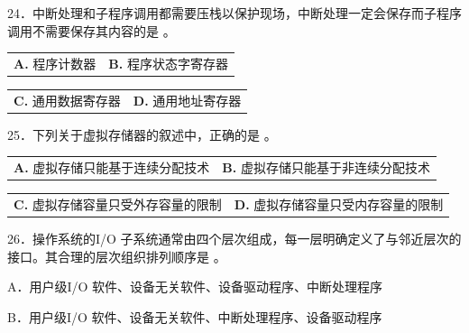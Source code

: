 \documentclass[UTF8,11pt]{ctexart}
\begin{document}
24．中断处理和子程序调用都需要压栈以保护现场，中断处理一定会保存而子程序调用不需要保存其内容的是 。


\begin{center}\begin{tabular}{>{\raggedright\arraybackslash}p{\dimexpr(\linewidth-4\tabcolsep)/2\relax}>{\raggedright\arraybackslash}p{\dimexpr(\linewidth-4\tabcolsep)/2\relax}}
\textbf{A.} 程序计数器 & \textbf{B.} 程序状态字寄存器\\[.35em]\end{tabular}\end{center}

\begin{center}\begin{tabular}{>{\raggedright\arraybackslash}p{\dimexpr(\linewidth-4\tabcolsep)/2\relax}>{\raggedright\arraybackslash}p{\dimexpr(\linewidth-4\tabcolsep)/2\relax}}
\textbf{C.} 通用数据寄存器 & \textbf{D.} 通用地址寄存器\\[.35em]\end{tabular}\end{center}

25．下列关于虚拟存储器的叙述中，正确的是 。


\begin{center}\begin{tabular}{>{\raggedright\arraybackslash}p{\dimexpr(\linewidth-4\tabcolsep)/2\relax}>{\raggedright\arraybackslash}p{\dimexpr(\linewidth-4\tabcolsep)/2\relax}}
\textbf{A.} 虚拟存储只能基于连续分配技术 & \textbf{B.} 虚拟存储只能基于非连续分配技术\\[.35em]\end{tabular}\end{center}

\begin{center}\begin{tabular}{>{\raggedright\arraybackslash}p{\dimexpr(\linewidth-4\tabcolsep)/2\relax}>{\raggedright\arraybackslash}p{\dimexpr(\linewidth-4\tabcolsep)/2\relax}}
\textbf{C.} 虚拟存储容量只受外存容量的限制 & \textbf{D.} 虚拟存储容量只受内存容量的限制\\[.35em]\end{tabular}\end{center}

26．操作系统的I/O 子系统通常由四个层次组成，每一层明确定义了与邻近层次的接口。其合理的层次组织排列顺序是 。


A．用户级I/O 软件、设备无关软件、设备驱动程序、中断处理程序


B．用户级I/O 软件、设备无关软件、中断处理程序、设备驱动程序
\end{document}

